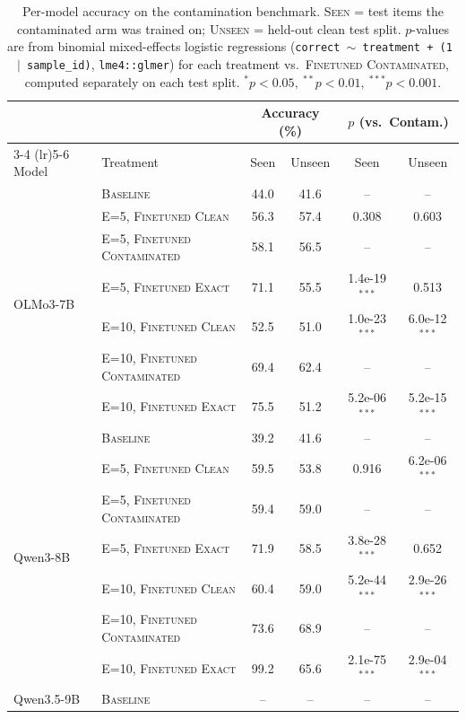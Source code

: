 \begin{table}[t]
\centering\small
\caption{Per-model accuracy on the contamination benchmark. \textsc{Seen} = test items the contaminated arm was trained on; \textsc{Unseen} = held-out clean test split. $p$-values are from binomial mixed-effects logistic regressions (\texttt{correct $\sim$ treatment + (1\,$\vert$\,sample\_id)}, \texttt{lme4::glmer}) for each treatment vs.\ \textsc{Finetuned Contaminated}, computed separately on each test split. $^{*}p<0.05,\ ^{**}p<0.01,\ ^{***}p<0.001$.}
\label{tab:contamination_summary}
\begin{tabular}{l l cc cc}
\toprule
 & & \multicolumn{2}{c}{Accuracy (\%)} & \multicolumn{2}{c}{$p$ (vs.\ Contam.)} \\
\cmidrule(lr){3-4} \cmidrule(lr){5-6}
Model & Treatment & Seen & Unseen & Seen & Unseen \\
\midrule
\multirow{7}{*}{OLMo3-7B} & \textsc{Baseline} & 44.0 & 41.6 & -- & -- \\
 & E=5, \textsc{Finetuned Clean} & 56.3 & 57.4 & 0.308 & 0.603 \\
 & E=5, \textsc{Finetuned Contaminated} & 58.1 & 56.5 & -- & -- \\
 & E=5, \textsc{Finetuned Exact} & 71.1 & 55.5 & 1.4e-19$^{***}$ & 0.513 \\
 & E=10, \textsc{Finetuned Clean} & 52.5 & 51.0 & 1.0e-23$^{***}$ & 6.0e-12$^{***}$ \\
 & E=10, \textsc{Finetuned Contaminated} & 69.4 & 62.4 & -- & -- \\
 & E=10, \textsc{Finetuned Exact} & 75.5 & 51.2 & 5.2e-06$^{***}$ & 5.2e-15$^{***}$ \\
\midrule
\multirow{7}{*}{Qwen3-8B} & \textsc{Baseline} & 39.2 & 41.6 & -- & -- \\
 & E=5, \textsc{Finetuned Clean} & 59.5 & 53.8 & 0.916 & 6.2e-06$^{***}$ \\
 & E=5, \textsc{Finetuned Contaminated} & 59.4 & 59.0 & -- & -- \\
 & E=5, \textsc{Finetuned Exact} & 71.9 & 58.5 & 3.8e-28$^{***}$ & 0.652 \\
 & E=10, \textsc{Finetuned Clean} & 60.4 & 59.0 & 5.2e-44$^{***}$ & 2.9e-26$^{***}$ \\
 & E=10, \textsc{Finetuned Contaminated} & 73.6 & 68.9 & -- & -- \\
 & E=10, \textsc{Finetuned Exact} & 99.2 & 65.6 & 2.1e-75$^{***}$ & 2.9e-04$^{***}$ \\
\midrule
\multirow{7}{*}{Qwen3.5-9B} & \textsc{Baseline} & -- & -- & -- & -- \\

\end{tabular}
\end{table}
